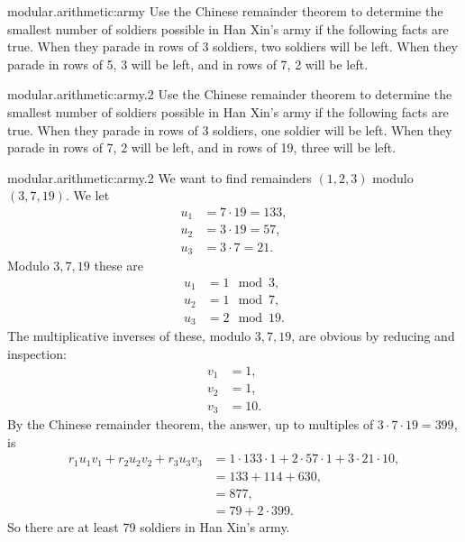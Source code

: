 \begin{problem}{modular.arithmetic:army}
Use the Chinese remainder theorem to determine the smallest number of soldiers possible in Han Xin's army if the following facts are true.
When they parade in rows of 3 soldiers, two soldiers will be left. When they parade in rows of 5, 3 will be left, and in rows of 7, 2 will be left.
\end{problem}

\begin{problem}{modular.arithmetic:army.2}
Use the Chinese remainder theorem to determine the smallest number of soldiers possible in Han Xin's army if the following facts are true.
When they parade in rows of 3 soldiers, one soldier will be left. When they parade in rows of 7, 2 will be left, and in rows of 19, three will be left.
\end{problem}
\begin{answer}{modular.arithmetic:army.2}
We want to find remainders \((1,2,3)\) modulo \((3,7,19)\).
We let 
\begin{align*}
u_1 &= 7 \cdot 19 = 133, \\
u_2 &= 3 \cdot 19 = 57, \\
u_3 &= 3 \cdot 7 = 21.
\end{align*}
Modulo \(3,7,19\) these are
\begin{align*}
u_1 &= 1 \mod{3}, \\
u_2 &= 1 \mod{7}, \\
u_3 &= 2 \mod{19}.
\end{align*}
The multiplicative inverses of these, modulo \(3,7,19\), are obvious by reducing and inspection:
\begin{align*}
v_1 &= 1, \\
v_2 &= 1, \\
v_3 &= 10.
\end{align*}
By the Chinese remainder theorem, the answer, up to multiples of \(3 \cdot 7 \cdot 19=399\), is
\begin{align*}
r_1 u_1 v_1 + r_2 u_2 v_2 + r_3 u_3 v_3 
&=
1 \cdot 133 \cdot 1 
+
2 \cdot 57 \cdot 1
+
3 \cdot 21 \cdot 10,
\\
&=
133+114+630,
\\
&=877,
\\
&=79+2 \cdot 399.
\end{align*}
So there are at least 79 soldiers in Han Xin's army.
\end{answer}


